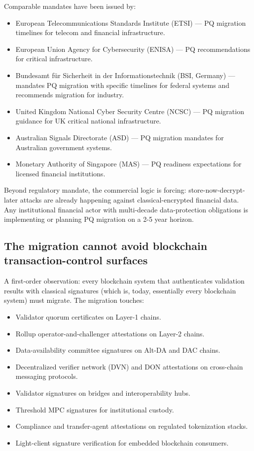 \documentclass[11pt,letterpaper]{article}
\begin{document}
Comparable mandates have been issued by:

\begin{itemize}
\item European Telecommunications Standards Institute (ETSI) --- PQ migration timelines for telecom and financial infrastructure.
\item European Union Agency for Cybersecurity (ENISA) --- PQ recommendations for critical infrastructure.
\item Bundesamt für Sicherheit in der Informationstechnik (BSI, Germany) --- mandates PQ migration with specific timelines for federal systems and recommends migration for industry.
\item United Kingdom National Cyber Security Centre (NCSC) --- PQ migration guidance for UK critical national infrastructure.
\item Australian Signals Directorate (ASD) --- PQ migration mandates for Australian government systems.
\item Monetary Authority of Singapore (MAS) --- PQ readiness expectations for licensed financial institutions.
\end{itemize}

Beyond regulatory mandate, the commercial logic is forcing: store-now-decrypt-later attacks are already happening against classical-encrypted financial data. Any institutional financial actor with multi-decade data-protection obligations is implementing or planning PQ migration on a 2-5 year horizon.

\subsection{The migration cannot avoid blockchain transaction-control surfaces}

A first-order observation: every blockchain system that authenticates validation results with classical signatures (which is, today, essentially every blockchain system) must migrate. The migration touches:

\begin{itemize}
\item Validator quorum certificates on Layer-1 chains.
\item Rollup operator-and-challenger attestations on Layer-2 chains.
\item Data-availability committee signatures on Alt-DA and DAC chains.
\item Decentralized verifier network (DVN) and DON attestations on cross-chain messaging protocols.
\item Validator signatures on bridges and interoperability hubs.
\item Threshold MPC signatures for institutional custody.
\item Compliance and transfer-agent attestations on regulated tokenization stacks.
\item Light-client signature verification for embedded blockchain consumers.
\end{itemize}
\end{document}

